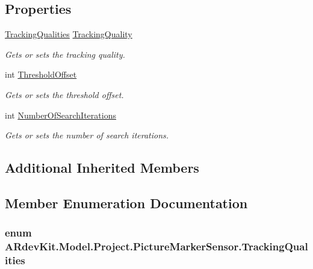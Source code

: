 \subsection*{Properties}
\begin{DoxyCompactItemize}
\item 
\hyperlink{class_a_rdev_kit_1_1_model_1_1_project_1_1_picture_marker_sensor_aff811596849fce290f77dea5f63b16c6}{Tracking\-Qualities} \hyperlink{class_a_rdev_kit_1_1_model_1_1_project_1_1_picture_marker_sensor_a312b8ea728d3018c96cb50ceb5c59f0c}{Tracking\-Quality}
\begin{DoxyCompactList}\small\item\em Gets or sets the tracking quality. \end{DoxyCompactList}\item 
int \hyperlink{class_a_rdev_kit_1_1_model_1_1_project_1_1_picture_marker_sensor_a423bb9bb3fb7916fc9705640f58522e6}{Threshold\-Offset}
\begin{DoxyCompactList}\small\item\em Gets or sets the threshold offset. \end{DoxyCompactList}\item 
int \hyperlink{class_a_rdev_kit_1_1_model_1_1_project_1_1_picture_marker_sensor_abdebe622c6ef02494e50d0caa2b142cb}{Number\-Of\-Search\-Iterations}
\begin{DoxyCompactList}\small\item\em Gets or sets the number of search iterations. \end{DoxyCompactList}\end{DoxyCompactItemize}
\subsection*{Additional Inherited Members}


\subsection{Member Enumeration Documentation}
\hypertarget{class_a_rdev_kit_1_1_model_1_1_project_1_1_picture_marker_sensor_aff811596849fce290f77dea5f63b16c6}{
\subsubsection[{Tracking\-Qualities}]{\setlength{\rightskip}{0pt plus 5cm}enum {\bf A\-Rdev\-Kit.\-Model.\-Project.\-Picture\-Marker\-Sensor.\-Tracking\-Qualities}}}\label{class_a_rdev_kit_1_1_model_1_1_project_1_1_picture_marker_sensor_aff811596849fce290f77dea5f63b16c6}


